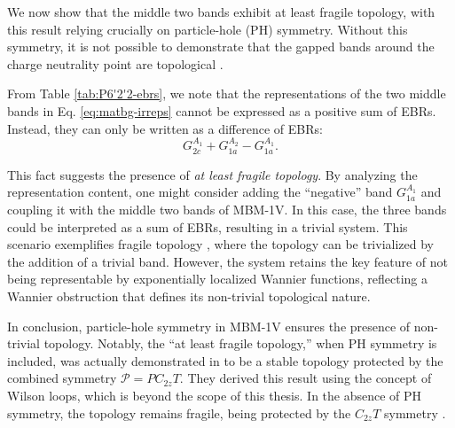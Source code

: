 We now show that the middle two bands exhibit at least fragile topology, with this result relying crucially on particle-hole (PH) symmetry. Without this symmetry, it is not possible to demonstrate that the gapped bands around the charge neutrality point are topological \cite{all_magic_angles}.

From Table \ref{tab:P6'2'2-ebrs}, we note that the representations of the two middle bands in Eq. \eqref{eq:matbg-irreps} cannot be expressed as a positive sum of EBRs. Instead, they can only be written as a difference of EBRs:
\begin{equation} \label{eq:matbg-difference_of_ebrs}
G_{2c}^{A_1} + G_{1a}^{A_2} - G_{1a}^{A_1}.
\end{equation}

This fact suggests the presence of \textit{at least fragile topology}. By analyzing the representation content, one might consider adding the ``negative'' band \( G_{1a}^{A_1} \) and coupling it with the middle two bands of MBM-1V. In this case, the three bands could be interpreted as a sum of EBRs, resulting in a trivial system. This scenario exemplifies fragile topology \cite{FragileTopology_Po2018}, where the topology can be trivialized by the addition of a trivial band. However, the system retains the key feature of not being representable by exponentially localized Wannier functions, reflecting a Wannier obstruction that defines its non-trivial topological nature.

In conclusion, particle-hole symmetry in MBM-1V ensures the presence of non-trivial topology. Notably, the ``at least fragile topology,'' when PH symmetry is included, was actually demonstrated in \cite{bernevig_II_2021} to be a stable topology protected by the combined symmetry \( \mathcal{P} = P C_{2z}T \). They derived this result using the concept of Wilson loops, which is beyond the scope of this thesis. In the absence of PH symmetry, the topology remains fragile, being protected by the \( C_{2z}T \) symmetry \cite{faithful_fragile_topology_po2019}.



%



